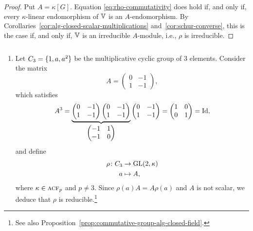 \begin{proof}
    Put $A=\kappa[G]$. Equation \eqref{eq:rho-commutativity} does hold if, and only if, every $\kappa$-linear endomorphism of $\mathbb V$ is an $A$-endomorphism. By Corollaries~\ref{cor:alg-closed-scalar-multiplications} and~\ref{cor:schur-converse}, this is the case if, and only if, $\mathbb V$ is an irreducible $A$-module, i.e., $\rho$ is irreducible.

\end{proof}

\begin{xmpls}${}$
    \begin{enumerate}[\rm a)]
        \item Let $C_3=\{1,a,a^2\}$ be the multiplicative cyclic group of $3$ elements. Consider the matrix
        $$
            A = \begin{pmatrix}
                0   &-1\\
                1   &-1
            \end{pmatrix},
        $$
        which satisfies
        $$
            A^3 = \underbrace{\begin{pmatrix}
                0   &-1\\
                1   &-1
            \end{pmatrix}
            \begin{pmatrix}
                0   &-1\\
                1   &-1
            \end{pmatrix}}_{\begin{pmatrix}
                -1   &1\\
                -1   &0
            \end{pmatrix}}
            \begin{pmatrix}
                0   &-1\\
                1   &-1
            \end{pmatrix}
            =\begin{pmatrix}
                1   &0\\
                0   &1
            \end{pmatrix}=\operatorname{Id},
        $$
        and define
        \begin{align*}
            \rho\colon C_3&\to\operatorname{GL}(2,\kappa)\\
            a&\mapsto A,
        \end{align*}
        where $\kappa\in\operatorname{\textnormal{\textsc{acf}}}_p$ and $p\ne3$. Since $\rho(a)A=A\rho(a)$ and $A$ is not scalar, we deduce that $\rho$ is reducible.\footnote{See also Proposition~\ref{prop:commutative-group-alg-closed-field}.}
    

\end{enumerate}
\end{xmpls}

